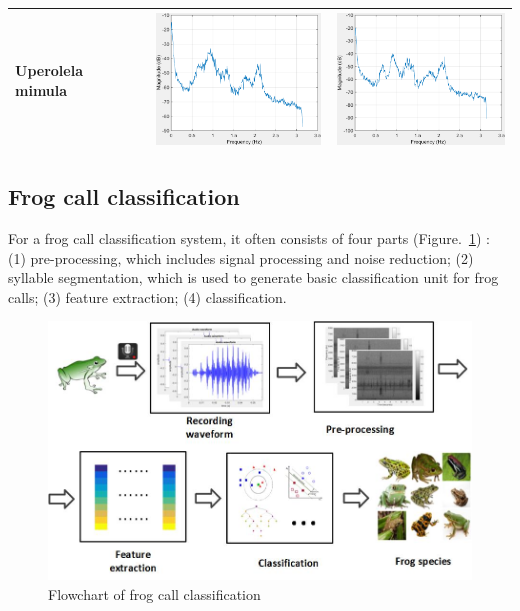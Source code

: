 \begin{table}[htb!]
{\begin{tabular}{lll}
Uperolela mimula            &   \begin{minipage}{.3\textwidth} \includegraphics[width=45mm, height=35mm]{image/8_signal.png}  \end{minipage}                              &                                             \begin{minipage}{.3\textwidth} \includegraphics[width=45mm, height=35mm]{image/8_noise.png}  \end{minipage} \\ \hline\hline
\end{tabular}
}
\end{table}

\subsection{Frog call classification}

For a frog call classification system, it often consists of four parts (Figure.~\ref{fig:Ch1_flowchart}) : (1) pre-processing, which includes signal processing and noise reduction; (2) syllable segmentation, which is used to generate basic classification unit for frog calls; (3) feature extraction; (4) classification.  



\begin{figure}[htb!]
\centering
\includegraphics[width=\textwidth]{image/flowchart.jpg}
\caption[Flowchart of frog call classification]{Flowchart of frog call classification}
\label{fig:Ch1_flowchart}
\end{figure}


